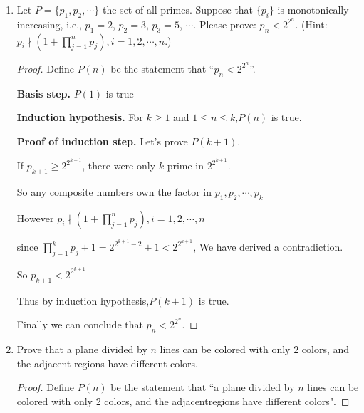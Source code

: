 \documentclass[12pt,a4paper]{article}
\theoremstyle{definition}
\begin{document}
\begin{enumerate}
\begin{proof}
        Since $k$ is the smallest value for which $P(k)$ is false, $P(k-1)$ is true.

        Thus $k-1=i_n \times 4+j_n \times 7$.

        If $j_n=0$, so $i_n>4$ ,
        
        However we have $$ k=k-1-4\times 5+7\times 3=(i_n-5)\times 4+(j_n+3)\times 7$$

        If $j_n\neq0$

        However we have $$ k=k-1+2\times 4-7=(i_n+2)\times 4+(j_n-1)\times 7$$

        We have derived a contradiction, which allows us to conclude that our original assumption is false.
    
    \end{proof}

    \item
    Let $P=\{p_1, p_2, \cdots\}$ the set of all primes. Suppose that $\{p_i\}$ is monotonically  increasing, i.e., $p_1=2$, $p_2=3$, $p_3=5$, $\cdots$. Please prove: $p_n<2^{2^n}$. {\color{blue}(Hint: $p_i \nmid (1+\prod_{j=1}^n p_j), i=1,2,\cdots,n$.)}
    \begin{proof}
        Define $P(n)$ be the statement that ``$p_n<2^{2^n}$''.

        \textbf{Basis step.} $P(1)$ is true

        \textbf{Induction hypothesis.} For $k\ge1$ and $1\le n\le k$,$P(n)$ is true.

        \textbf{Proof of induction step.} Let's prove $P(k+1)$.

        If $p_{k+1}\ge2^{2^{k+1}}$, there were only $k$ prime in $2^{2^{k+1}}$.
        
        So any composite numbers own the factor in $p_1,p_2,\cdots,p_k$

        However $p_i \nmid (1+\prod_{j=1}^n p_j), i=1,2,\cdots,n$

        since $\prod_{j=1}^k p_j+1=2^{2^{k+1}-2}+1<2^{2^{k+1}}$, We have derived a contradiction.

        So $p_{k+1}<2^{2^{k+1}}$

        Thus by induction hypothesis,$P(k+1)$ is true.

        Finally we can conclude that $p_n<2^{2^n}$.

        \end{proof}

    \item
    Prove that a plane divided by $n$ lines can be colored with only $2$ colors, and the adjacent regions have different colors.
    \begin{proof}
        Define $P(n)$ be the statement that ``a  plane  divided  by $n$ lines  can  be  colored  with  only  2  colors,  and  the  adjacentregions have different colors".
        

\end{proof}
\end{enumerate}
\end{document}
